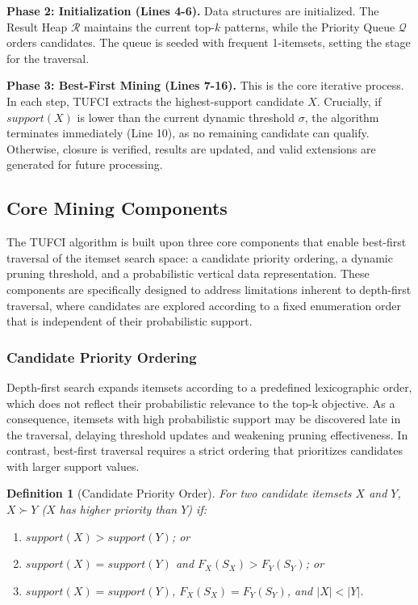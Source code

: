 \documentclass[10pt,letterpaper]{article}
\newtheorem{definition}{Definition}[section]
\newcounter{definition}
\begin{document}
\textbf{Phase 2: Initialization (Lines 4-6).} 
Data structures are initialized. The Result Heap $\mathcal{R}$ maintains the current top-$k$ patterns, while the Priority Queue $\mathcal{Q}$ orders candidates. The queue is seeded with frequent 1-itemsets, setting the stage for the traversal.

\textbf{Phase 3: Best-First Mining (Lines 7-16).} 
This is the core iterative process. In each step, TUFCI extracts the highest-support candidate $X$. Crucially, if $support(X)$ is lower than the current dynamic threshold $\sigma$, the algorithm terminates immediately (Line 10), as no remaining candidate can qualify. Otherwise, closure is verified, results are updated, and valid extensions are generated for future processing.

\subsection*{Core Mining Components}

The TUFCI algorithm is built upon three core components that enable best-first traversal of the itemset search space: a candidate priority ordering, a dynamic pruning threshold, and a probabilistic vertical data representation. These components are specifically designed to address limitations inherent to depth-first traversal, where candidates are explored according to a fixed enumeration order that is independent of their probabilistic support.

\subsubsection*{Candidate Priority Ordering}

Depth-first search expands itemsets according to a predefined lexicographic order, which does not reflect their probabilistic relevance to the top-{k} objective. As a consequence, itemsets with high probabilistic support may be discovered late in the traversal, delaying threshold updates and weakening pruning effectiveness. In contrast, best-first traversal requires a strict ordering that prioritizes candidates with larger support values.

\begin{definition}[Candidate Priority Order]
\label{def:priority_order}
For two candidate itemsets $X$ and $Y$, $X \succ Y$ ($X$ has higher priority than $Y$) if:
\begin{enumerate}
    \item $\mathit{support}(X) > \mathit{support}(Y)$; or
    \item $\mathit{support}(X) = \mathit{support}(Y)$ and $F_X(S_X) > F_Y(S_Y)$; or
    \item $\mathit{support}(X) = \mathit{support}(Y)$, $F_X(S_X) = F_Y(S_Y)$, and $|X| < |Y|$.
\end{enumerate}
\end{definition}
\end{document}
